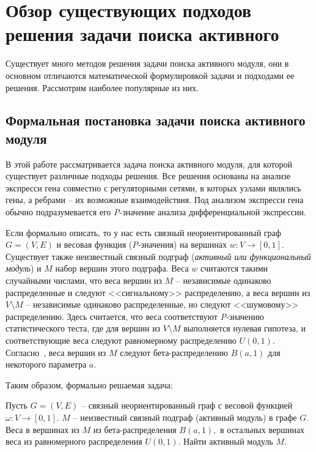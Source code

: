 \chapter{Обзор существующих подходов решения задачи поиска активного}
\label{section_module}

Существует много методов решения задачи поиска активного модуля, они в основном
отличаются математической формулировкой задачи и подходами ее решения.
Рассмотрим наиболее популярные из них.





\section{Формальная постановка задачи поиска активного модуля}

В этой работе рассматривается задача поиска активного модуля, для которой
существует различные подходы решения.  Все решения основаны на анализе
экспресси гена совместно с регуляторными сетями, в которых узлами являлись
гены, а ребрами -- их возможные взаимодействия. Под анализом экспресси гена
обычно подразумевается его \emph{P}-значение анализа дифференциальной
экспрессии.

Если формально описать, то у нас есть связный неориентированный граф $G = (V,
E)$ и весовая функция (\emph{P}-значения) на вершинах $w: V \to [0, 1]$.
Существует также неизвестный связный подграф (\emph{активный или функциональный
модуль}) и $M$ набор вершин этого подграфа.  Веса $w$ считаются такими
случайными числами, что веса вершин из $M$ -- независимые одинаково
распределенные и следуют <<сигнальному>> распределению, а веса вершин из $V
\setminus M$ -- независимые одинаково распределенные, но следуют <<шумовому>>
распределению.  Здесь считается, что веса соответствуют \emph{P}-значению
статистического теста, где для вершин из $V \setminus M$ выполняется нулевая
гипотеза, и соответствующие веса следуют равномерному распределению $U(0, 1)$.
Согласно~\cite{Dittrich2008a}, веса вершин из $M$ следуют бета-распределению
$B(a, 1)$ для некоторого параметра $a$.

Таким образом, формально решаемая задача:
\begin{problem}
    Пусть $G=(V, E)$ -- связный неориентированный граф с весовой функцией
    $\omega : V \to [0, 1].$ $M$ -- неизвестный связный подграф (активный
    модуль) в графе $G.$ Веса в вершинах из $M$ из бета-распределения $B(a,
    1),$ в остальных вершинах веса из равномерного распределения $U(0, 1).$
      Найти активный модуль $M$.
\end{problem}





